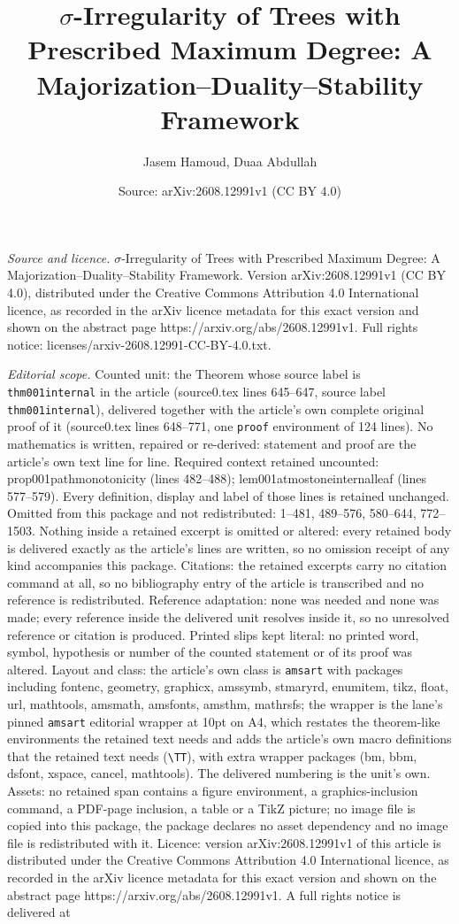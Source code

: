 \documentclass[10pt,a4paper]{amsart}
\title[$\sigma$-Irregularity of Trees with Prescribed Maximum Degre]{$\sigma$-Irregularity of Trees with Prescribed Maximum Degree: A Majorization--Duality--Stability Framework}
\author{Jasem Hamoud, Duaa Abdullah}
\date{Source: arXiv:2608.12991v1 (CC BY 4.0)}
\begin{document}
\maketitle

\noindent\emph{Source and licence.} $\sigma$-Irregularity of Trees with Prescribed Maximum Degree: A Majorization--Duality--Stability Framework. Version arXiv:2608.12991v1 (CC BY 4.0), distributed under the Creative Commons Attribution 4.0 International licence, as recorded in the arXiv licence metadata for this exact version and shown on the abstract page https://arxiv.org/abs/2608.12991v1. Full rights notice: licenses/arxiv-2608.12991-CC-BY-4.0.txt.\par\smallskip

\noindent\textit{Editorial scope.} Counted unit: the Theorem whose source label is \texttt{thm001internal} in the article (source0.tex lines 645--647, source label \texttt{thm001internal}), delivered together with the article's own complete original proof of it (source0.tex lines 648--771, one \texttt{proof} environment of 124 lines). No mathematics is written, repaired or re-derived: statement and proof are the article's own text line for line. Required context retained uncounted: prop001pathmonotonicity (lines 482--488); lem001atmostoneinternalleaf (lines 577--579). Every definition, display and label of those lines is retained unchanged. Omitted from this package and not redistributed: 1--481, 489--576, 580--644, 772--1503. Nothing inside a retained excerpt is omitted or altered: every retained body is delivered exactly as the article's lines are written, so no omission receipt of any kind accompanies this package. Citations: the retained excerpts carry no citation command at all, so no bibliography entry of the article is transcribed and no reference is redistributed. Reference adaptation: none was needed and none was made; every reference inside the delivered unit resolves inside it, so no unresolved reference or citation is produced. Printed slips kept literal: no printed word, symbol, hypothesis or number of the counted statement or of its proof was altered. Layout and class: the article's own class is \texttt{amsart} with packages including fontenc, geometry, graphicx, amssymb, stmaryrd, enumitem, tikz, float, url, mathtools, amsmath, amsfonts, amsthm, mathrsfs; the wrapper is the lane's pinned \texttt{amsart} editorial wrapper at 10pt on A4, which restates the theorem-like environments the retained text needs and adds the article's own macro definitions that the retained text needs (\texttt{\textbackslash TT}), with extra wrapper packages (bm, bbm, dsfont, xspace, cancel, mathtools). The delivered numbering is the unit's own. Assets: no retained span contains a figure environment, a graphics-inclusion command, a PDF-page inclusion, a table or a TikZ picture; no image file is copied into this package, the package declares no asset dependency and no image file is redistributed with it. Licence: version arXiv:2608.12991v1 of this article is distributed under the Creative Commons Attribution 4.0 International licence, as recorded in the arXiv licence metadata for this exact version and shown on the abstract page https://arxiv.org/abs/2608.12991v1. A full rights notice is delivered at 
\end{document}
